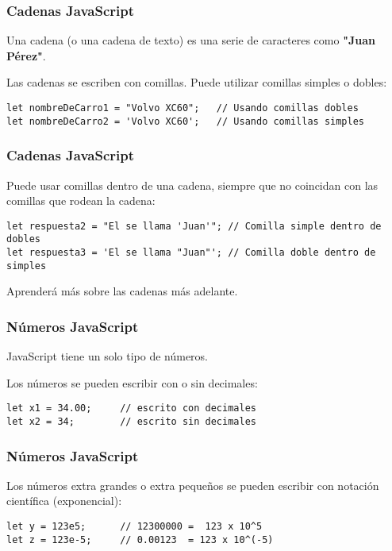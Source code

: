 \begin{frame}[fragile]
  \frametitle{Cadenas JavaScript}

  Una cadena (o una cadena de texto) es una serie de
  caracteres como \textbf{"Juan Pérez"}.

  \vspace{\baselineskip}
  Las cadenas se escriben con comillas. Puede utilizar
  comillas simples o dobles:

  \vspace{\baselineskip}
  \begin{lstlisting}
let nombreDeCarro1 = "Volvo XC60";   // Usando comillas dobles
let nombreDeCarro2 = 'Volvo XC60';   // Usando comillas simples
  \end{lstlisting}
\end{frame}

\begin{frame}[fragile]
  \frametitle{Cadenas JavaScript}

  Puede usar comillas dentro de una cadena, siempre que no
  coincidan con las comillas que rodean la cadena:

  \vspace{\baselineskip}
  \begin{lstlisting}
let respuesta2 = "El se llama 'Juan'"; // Comilla simple dentro de dobles
let respuesta3 = 'El se llama "Juan"'; // Comilla doble dentro de simples
  \end{lstlisting}

  \vspace{\baselineskip}
  Aprenderá más sobre las cadenas más adelante.
\end{frame}

\begin{frame}[fragile]
  \frametitle{Números JavaScript}

  JavaScript tiene un solo tipo de números.

  \vspace{\baselineskip}
  Los números se pueden escribir con o sin decimales:

  \vspace{\baselineskip}
  \begin{lstlisting}
let x1 = 34.00;     // escrito con decimales
let x2 = 34;        // escrito sin decimales
  \end{lstlisting}
\end{frame}

\begin{frame}[fragile]
  \frametitle{Números JavaScript}

  Los números extra grandes o extra pequeños se pueden escribir
  con notación científica (exponencial):

  \vspace{\baselineskip}
  \begin{lstlisting}
let y = 123e5;      // 12300000 =  123 x 10^5
let z = 123e-5;     // 0.00123  = 123 x 10^(-5)
  \end{lstlisting}
\end{frame}

